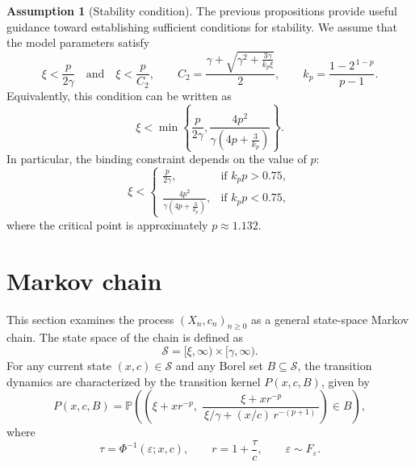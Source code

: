 \documentclass[11pt]{article}
\theoremstyle{definition}
\newtheorem{assumption}{Assumption}
\begin{document}
\begin{assumption}[Stability condition]\label{Ass:stability}
	The previous propositions provide useful guidance toward establishing sufficient conditions for stability.
	We assume that the model parameters satisfy
	\begin{equation}
		\xi < \frac{p}{2\gamma}
		\quad \text{and} \quad
		\xi < \frac{p}{C_2},
		\qquad
		C_2 = \frac{\gamma + \sqrt{\gamma^2 + \frac{3\gamma}{k_p \xi}}}{2},
		\qquad
		k_p = \frac{1-2^{\,1-p}}{p-1}.
		\label{Eq:condition}
	\end{equation}
	Equivalently, this condition can be written as
	\begin{equation}
		\xi < \min\!\left\{
		\frac{p}{2 \gamma},
		\frac{4p^2}{\gamma \left( 4p + \frac{3}{k_p} \right)} \label{Eq:condition2}
		\right\}.
	\end{equation}
	In particular, the binding constraint depends on the value of $p$:
	\begin{equation}
		\xi <
		\begin{cases}
			\displaystyle \frac{p}{2\gamma}, & \text{if } k_p p > 0.75, \\[10pt]
			\displaystyle \frac{4p^2}{\gamma \left( 4p + \frac{3}{k_p} \right)},
			& \text{if } k_p p < 0.75,
		\end{cases}
	\end{equation}
	where the critical point is approximately $p \approx 1.132$.
\end{assumption}

\section{Markov chain}\label{Sect:MC}

This section examines the process ${(X_n, c_n)}_{n \ge 0}$ as a general state-space Markov chain.
The state space of the chain is defined as
\[
\mathcal{S} = [\xi, \infty) \times [\gamma, \infty).
\]
For any current state $(x, c) \in \mathcal{S}$ and any Borel set $B \subseteq \mathcal{S}$,
the transition dynamics are characterized by the transition kernel \( P(x, c, B) \), given by
\begin{equation}
	P(x, c, B)
	= \mathbb{P} \left(
	\left( \xi + x r^{-p},\;
	\frac{\,\xi + x r^{-p}}
	{\,\xi/\gamma + (x/c)\,r^{-(p+1)}\,} \right)
	\in B
	\right),
	\label{Eq:P}
\end{equation}
where
\[
\tau = \Phi^{-1}(\varepsilon; x, c), \qquad
r = 1 + \frac{\tau}{c}, \qquad
\varepsilon \sim F_\varepsilon.
\]
\end{document}
